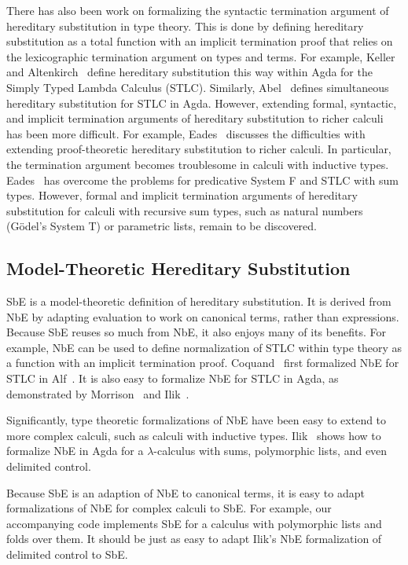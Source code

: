 \documentclass[runningheads,a4paper]{llncs}
\begin{document}
There has also been work on formalizing the syntactic termination
argument of hereditary substitution in type theory. This is done by defining
hereditary substitution as a total function with an implicit
termination proof that relies on the lexicographic termination
argument on types and terms. For example, Keller and Altenkirch~\cite{keller}
define hereditary substitution this way within Agda for the Simply
Typed Lambda Calculus (STLC). Similarly, Abel~\cite{abelhsub} defines
simultaneous hereditary substitution for STLC in Agda. However,
extending formal, syntactic, and implicit termination arguments of
hereditary substitution to richer calculi has been more difficult. For
example, Eades~\cite{eadesreach} discusses the difficulties with
extending proof-theoretic hereditary substitution to richer calculi.
In particular, the termination argument becomes troublesome in
calculi with inductive types. Eades~\cite{eadessystemf} has overcome
the problems for predicative System F and STLC with sum types.
However, formal and implicit termination arguments of hereditary
substitution for calculi with recursive sum types, such as natural
numbers (G{\"o}del's System T) or parametric lists, remain to be discovered.

\subsection{Model-Theoretic Hereditary Substitution}

SbE is a model-theoretic definition of hereditary substitution. It is
derived from NbE by adapting evaluation to work on canonical terms,
rather than expressions. Because SbE reuses so much from NbE, it also enjoys
many of its benefits. For example, NbE can be used to define
normalization of STLC within type theory as a function with an
implicit termination proof. Coquand~\cite{coquandnbe} first formalized NbE for
STLC in Alf~\cite{alf}. It is also easy to formalize NbE for STLC in Agda,
as demonstrated by Morrison~\cite{morrison} and Ilik~\cite{ilik}.

Significantly, type theoretic formalizations of NbE have been easy to
extend to more complex calculi, such as calculi with inductive types.
Ilik~\cite{ilik} shows how to formalize NbE in Agda for a $\lambda$-calculus
with sums, polymorphic lists, and even delimited control. 

Because SbE is an adaption of NbE to canonical terms, it is easy to
adapt formalizations of NbE for complex calculi to SbE. For example,
our accompanying code implements SbE for a calculus with polymorphic
lists and folds over them. It should be just as easy to adapt Ilik's NbE
formalization of delimited control to SbE.
\end{document}
